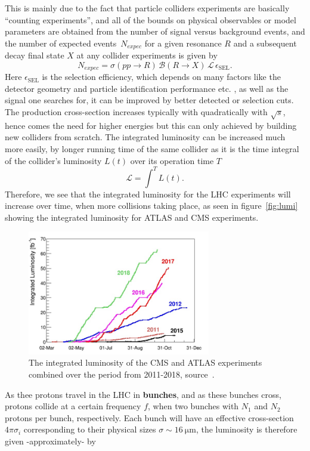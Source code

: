 This is mainly due to the fact that particle colliders experiments are basically ``counting experiments'', and all of the bounds on physical observables or model parameters are obtained from the number of signal versus background events, and the number of expected events~$N_{expec}$ for a given resonance $R$ and a subsequent decay final state $X$ at any collider experiments is given by
\begin{equation}
	N_{expec} = \sigma(pp\to R) \, \mathcal B(R \to X)\,\mathscr{L}  \, \epsilon_{\mathrm{SEL}}.
\end{equation}
Here $ \epsilon_{\mathrm{SEL}}$ is the selection efficiency, which depends on many factors like the detector geometry and particle identification performance etc. , as well as the signal one searches for, it can be improved by better detected or selection cuts. The production cross-section increases typically with quadratically with $\sqrt {s}$, hence comes the need for higher energies but this can only achieved by building new colliders from scratch. The integrated luminosity can be increased much more easily, by longer running time of the same collider as it is the time integral of the collider's luminosity $L(t)$ over its operation time $T$
\begin{equation}
\mathscr{L} = \int^{T} L(t) .
\end{equation}
Therefore, we see that the integrated luminosity for the LHC experiments will increase over time, when more collisions taking place, as seen in figure~\autoref{fig:lumi} showing the integrated luminosity for ATLAS and CMS experiments. 
\begin{figure}[t!]
	\begin{center}
		\includegraphics[width=8cm]{figures/lhc_lumi}
		\caption{The integrated luminosity of the CMS and ATLAS experiments combined over the period from 2011-2018, source~\cite{lhcpreformance}.  \label{fig:lumi} }
	\end{center}
\end{figure}
As thee protons travel in the LHC in \textbf{bunches}, and as these bunches cross, protons collide at a certain frequency $f$,  when two bunches with $N_1$ and $N_2$ protons per bunch, respectively. Each bunch will have an effective cross-section~$4 \pi \sigma_i$ corresponding to their physical sizes $\sigma \sim \SI{16}{\micro \meter}$, the luminosity is therefore given -approximately- by 
